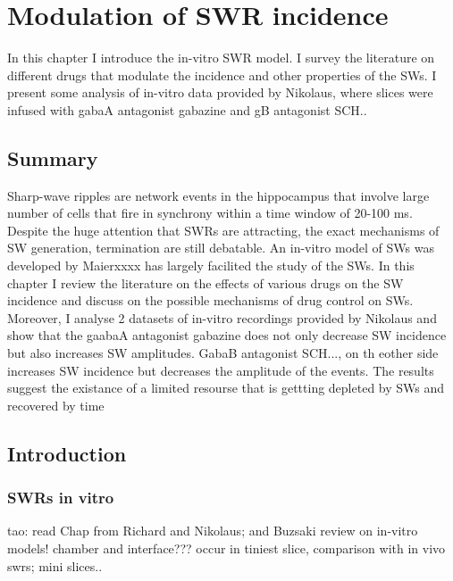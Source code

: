 \chapter{Modulation of SWR incidence}

  In this chapter I introduce the in-vitro SWR model. I survey the literature
  on different drugs that modulate the incidence and other properties of the
  SWs. I present some analysis of in-vitro data provided by Nikolaus, where
  slices were infused with gabaA antagonist gabazine and gB antagonist SCH..

\section{Summary}

  Sharp-wave ripples are network events in the hippocampus that involve large
  number of cells that fire in synchrony within a time window of 20-100 ms.
  Despite the huge attention that SWRs are attracting, the exact mechanisms of SW
  generation, termination are still debatable.  An in-vitro model of SWs was
  developed by Maierxxxx has largely facilited the study of the SWs. In this
  chapter I review the literature on the effects of various drugs on the SW
  incidence and discuss on the possible mechanisms of drug control on SWs.
  Moreover, I analyse 2 datasets of in-vitro recordings provided by Nikolaus and
  show that the gaabaA antagonist gabazine does not only decrease SW incidence
  but also increases SW amplitudes. GabaB antagonist SCH..., on th eother side
  increases SW incidence but decreases the amplitude of the events. The results
  suggest the existance of a limited resourse that is gettting depleted by SWs
  and recovered by time


\section{Introduction}

  \subsection{SWRs in vitro}
    tao: read Chap from Richard and Nikolaus; and Buzsaki review on in-vitro models!
    chamber and interface???
    occur in tiniest slice, comparison with in vivo swrs; mini slices..


